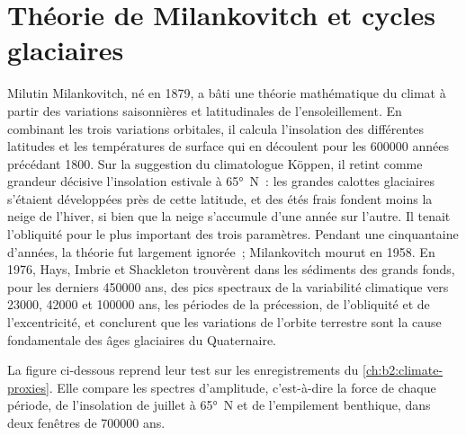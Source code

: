 \section{Théorie de Milankovitch et cycles glaciaires}\label{sec:b2:orbital-forcing:theory}

\begin{history}
Milutin Milankovitch, né en 1879, a bâti une théorie mathématique du climat à partir des variations saisonnières et latitudinales de l'ensoleillement. En combinant les trois variations orbitales,
il calcula l'insolation des différentes latitudes et les températures de surface qui en découlent pour les \num{600000} années précédant 1800.
Sur la suggestion du climatologue Köppen, il retint comme grandeur décisive l'insolation estivale à \ang{65}~N~: les grandes calottes glaciaires s'étaient développées
près de cette latitude, et des étés frais fondent moins la neige de l'hiver, si bien que la neige s'accumule
d'une année sur l'autre. Il tenait l'obliquité pour le plus important des trois paramètres. Pendant une cinquantaine
d'années, la théorie fut largement ignorée~; Milankovitch mourut en 1958. En 1976, Hays, Imbrie et Shackleton trouvèrent
dans les sédiments des grands fonds,
pour les derniers \num{450000} ans, des pics spectraux de la variabilité climatique
vers \num{23000}, \num{42000} et \num{100000} ans, les périodes de la précession, de l'obliquité
et de l'excentricité, et conclurent que les variations de l'orbite terrestre
sont la cause fondamentale des âges glaciaires du Quaternaire.
\end{history}

La figure ci-dessous reprend leur test sur les enregistrements du \cref{ch:b2:climate-proxies}. Elle compare les spectres d'amplitude, c'est-à-dire la force de chaque période,
de l'insolation de juillet à \ang{65}~N et de l'empilement benthique,
dans deux fenêtres de \num{700000} ans.

